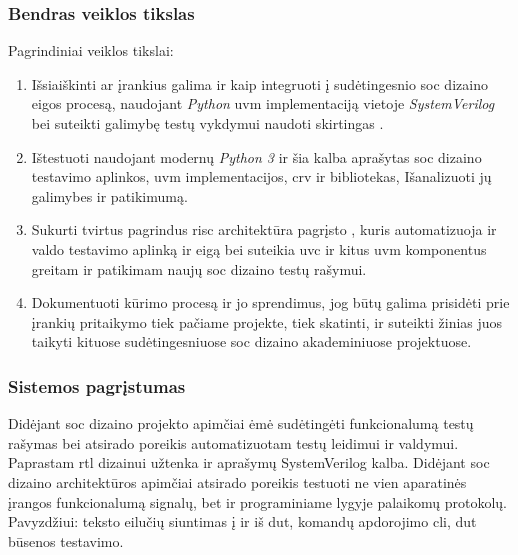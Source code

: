 \subsubsection{Bendras veiklos tikslas}

Pagrindiniai veiklos tikslai:
\begin{enumerate}
	\item Išsiaiškinti ar  įrankius galima ir kaip integruoti į sudėtingesnio \gls{soc} dizaino  eigos procesą, naudojant \textit{Python} \gls{uvm} implementaciją vietoje \textit{SystemVerilog} bei suteikti galimybę testų vykdymui naudoti skirtingas .
	\item Ištestuoti   naudojant modernų \textit{Python 3} ir šia kalba aprašytas  \gls{soc} dizaino testavimo aplinkos, \gls{uvm} implementacijos, \gls{crv} ir  bibliotekas, Išanalizuoti jų galimybes ir patikimumą.
	\item Sukurti tvirtus pagrindus \gls{risc} architektūra pagrįsto   , kuris automatizuoja ir valdo testavimo aplinką ir eigą bei suteikia \gls{uvc} ir kitus \gls{uvm} komponentus greitam ir patikimam naujų \gls{soc} dizaino testų rašymui.
	\item Dokumentuoti kūrimo procesą ir jo sprendimus, jog būtų galima prisidėti prie  įrankių pritaikymo tiek pačiame projekte, tiek skatinti, ir suteikti žinias juos taikyti kituose sudėtingesniuose \gls{soc} dizaino akademiniuose projektuose.
\end{enumerate}


\subsubsection{Sistemos pagrįstumas}

Didėjant \gls{soc} dizaino projekto apimčiai \lent{\ref{fig:mlab_mcu_architecture}} ėmė sudėtingėti funkcionalumą  testų rašymas bei atsirado poreikis automatizuotam testų leidimui ir valdymui. Paprastam \gls{rtl} dizainui užtenka ir  aprašymų SystemVerilog kalba. Didėjant \gls{soc} dizaino architektūros apimčiai atsirado poreikis testuoti ne vien aparatinės įrangos funkcionalumą signalų, bet ir programiniame lygyje palaikomų protokolų. Pavyzdžiui: teksto eilučių siuntimas į ir iš \gls{dut}, komandų apdorojimo \gls{cli}, \gls{dut} būsenos testavimo.

